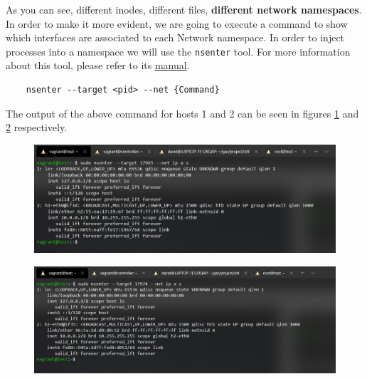 \documentclass[12pt]{article}
\begin{document}
			As you can see, different inodes, different files, \textbf{different network namespaces}. In order to make it more evident, we are going to execute a command to show which interfaces are associated to each Network namespace. In order to inject processes into a namespace we will use the \texttt{nsenter} tool. For more information about this tool, please refer to its \href{http://man7.org/linux/man-pages/man1/nsenter.1.html}{manual}.

			\begin{verbatim}
	nsenter --target <pid> --net {Command}
			\end{verbatim}

			The output of the above command for hosts 1 and 2 can be seen in figures \ref{f:host1_intf} and \ref{f:host2_intf} respectively.
			
			\newpage

			\begin{figure}[!htb]
				\centering
				\includegraphics[width=\linewidth]{host1_intf.png}
				\label{f:host1_intf}
			\end{figure}

			\begin{figure}[!htb]
				\centering
				\includegraphics[width=\linewidth]{host2_intf.png}
				\label{f:host2_intf}
			\end{figure}
\end{document}

